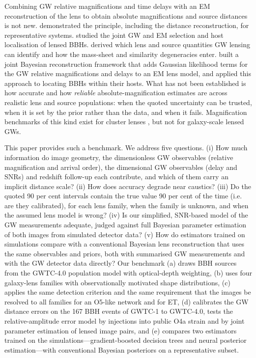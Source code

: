 Combining GW relative magnifications and time delays with an EM reconstruction of the lens to obtain absolute magnifications and source distances is not new. \citet{hannuksela2020localizing} demonstrated the principle, including the distance reconstruction, for representative systems. \citet{wempe2022lensing} studied the joint GW and EM selection and host localisation of lensed BBHs. \citet{poon2025degeneracy} derived which lens and source quantities GW lensing can identify and how the mass-sheet and similarity degeneracies enter. \citet{uronen2026silmarel} built a joint Bayesian reconstruction framework that adds Gaussian likelihood terms for the GW relative magnifications and delays to an EM lens model, and \citet{uronen2026galacticcentres} applied this approach to locating BBHs within their hosts. What has not been established is how accurate and how \emph{reliable} absolute-magnification estimates are across realistic lens and source populations: when the quoted uncertainty can be trusted, when it is set by the prior rather than the data, and when it fails. Magnification benchmarks of this kind exist for cluster lenses \citep{meneghetti2017ff}, but not for galaxy-scale lensed GWs.

This paper provides such a benchmark. We address five questions. (i) How much information do image geometry, the dimensionless GW observables (relative magnification and arrival order), the dimensional GW observables (delay and SNRs) and redshift follow-up each contribute, and which of them carry an implicit distance scale? (ii) How does accuracy degrade near caustics? (iii) Do the quoted 90 per cent intervals contain the true value 90 per cent of the time (i.e. are they calibrated), for each lens family, when the family is unknown, and when the assumed lens model is wrong? (iv) Is our simplified, SNR-based model of the GW measurements adequate, judged against full Bayesian parameter estimation of both images from simulated detector data? (v) How do estimators trained on simulations compare with a conventional Bayesian lens reconstruction that uses the same observables and priors, both with summarised GW measurements and with the GW detector data directly? Our benchmark (a) draws BBH sources from the GWTC-4.0 population model \citep{lvk2025gwtc4pop} with optical-depth weighting, (b) uses four galaxy-lens families with observationally motivated shape distributions, (c) applies the same detection criterion and the same requirement that the images be resolved to all families for an O5-like network and for ET, (d) calibrates the GW distance errors on the 167 BBH events of GWTC-1 to GWTC-4.0, tests the relative-amplitude error model by injections into public O4a strain and by joint parameter estimation of lensed image pairs, and (e) compares two estimators trained on the simulations---gradient-boosted decision trees and neural posterior estimation---with conventional Bayesian posteriors on a representative subset.

